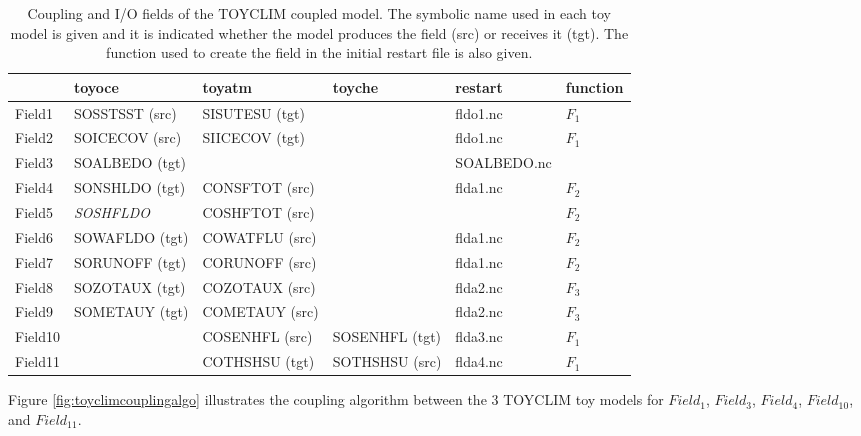 \vspace*{1ex}
\begin{table}[ht]
	\begin{tabularx}{16cm}[t]{|l|l|l|l|l|X|}
	\hline
	  & 
	 toyoce & 
	 toyatm & 
	 toyche &
	 restart &
	 function \\
	\hline\hline
	 Field1 & 
	 SOSSTSST (src) & 
	 SISUTESU (tgt) &
	 & 
	 fldo1.nc &
	 $F_1$ \\
	\hline
	 Field2 & 
	 SOICECOV (src) & 
	 SIICECOV (tgt) &
	 & 
	 fldo1.nc &
	 $F_1$ \\
	\hline
	 Field3 & 
	 SOALBEDO (tgt) & 
	 & 
	 &
	 SOALBEDO.nc &
	  \\
	\hline
         Field4 & 
	 SONSHLDO (tgt) &
	 CONSFTOT (src) &
	 &
	 flda1.nc &
	 $F_2$ \\
	\hline
         Field5  &    
         {\it SOSHFLDO}&
	 COSHFTOT (src)&
	 &
	 &
	 $F_2$ \\
	\hline
         Field6 &    
         SOWAFLDO (tgt) &
         COWATFLU (src) &
         &
         flda1.nc &
	 $F_2$ \\
	\hline    
         Field7 & 
         SORUNOFF (tgt) &
         CORUNOFF (src) &
         &
         flda1.nc &
	 $F_2$ \\
	\hline    
         Field8 &
         SOZOTAUX (tgt)&
         COZOTAUX (src)&
         &
         flda2.nc &
	 $F_3$ \\
	\hline    
         Field9 &
         SOMETAUY (tgt)&
         COMETAUY (src)&
         &
         flda2.nc &
	 $F_3$ \\
	\hline
	 Field10 &
         &
         COSENHFL (src) &
         SOSENHFL (tgt) &
         flda3.nc &
	 $F_1$ \\
	 \hline
	 Field11 &
         &
         COTHSHSU (tgt)&
         SOTHSHSU (src) &
         flda4.nc &
	 $F_1$ \\
	 \hline	         
	\end{tabularx}
\caption[Coupling and I/O fields of the TOYCLIM coupled model]
	{Coupling and I/O fields of the TOYCLIM coupled model. The
	symbolic name used in each toy model is given and it is
	indicated whether the model produces the field (src) or
	receives it (tgt). The function used to create the field in
	the initial restart file is also given.}
\label{tab:couplingIOfields}
\end{table}
\vspace*{1ex}

Figure \ref{fig:toyclimcouplingalgo} illustrates the coupling
algorithm between the 3 TOYCLIM toy models for $Field_1$, $Field_3$,
$Field_4$, $Field_{10}$, and $Field_{11}$.

